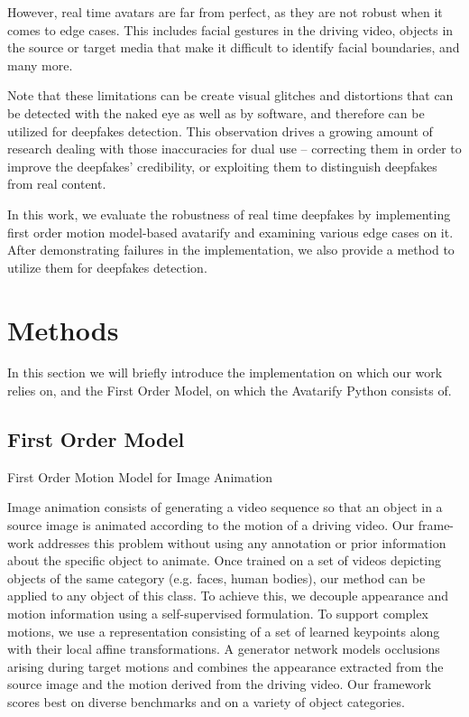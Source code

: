 \documentclass[english,12pt]{article}
\begin{document}
However, real time avatars are far from perfect, as they are not robust when it comes to edge cases.
This includes facial gestures in the driving video, objects in the source or target media that make it
difficult to identify facial boundaries, and many more.


Note that these limitations can be create visual glitches and distortions that can be detected with the
naked eye as well as by software, and therefore can be utilized for deepfakes detection. This observation
drives a growing amount of research dealing with those inaccuracies for dual use -- correcting them in
order to improve the deepfakes' credibility, or exploiting them to distinguish deepfakes from real content.

In this work, we evaluate the robustness of real time deepfakes by implementing first order motion
model-based avatarify and examining various edge cases on it. After demonstrating failures in the
implementation, we also provide a method to utilize them for deepfakes detection.



\section{Methods} \label{methods}

In this section we will briefly introduce the implementation on which our work relies on, and the
First Order Model, on which the Avatarify Python consists of.

\subsection{First Order Model}




First Order Motion Model for Image Animation

Image animation consists of generating a video sequence so that an object in a source image is animated
according to the motion of a driving video. Our frame- work addresses this problem without using any
annotation or prior information about the specific object to animate. Once trained on a set of videos
depicting objects of the same category (e.g. faces, human bodies), our method can be applied to any
object of this class. To achieve this, we decouple appearance and motion information using a self-supervised
formulation. To support complex motions, we use a representation consisting of a set of learned keypoints
along with their local affine transformations. A generator network models occlusions arising during target
motions and combines the appearance extracted from the source image and the motion derived from the driving
video. Our framework scores best on diverse benchmarks and on a variety of object categories.
\end{document}
